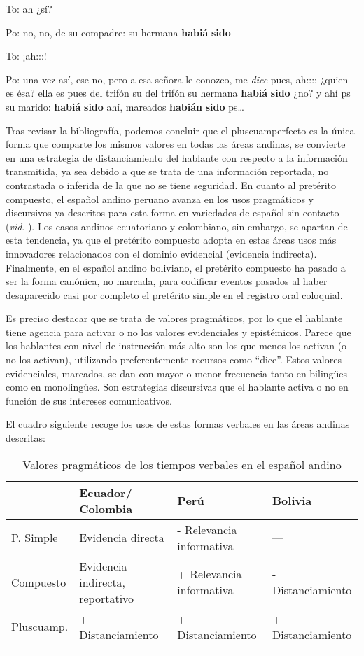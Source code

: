 \documentclass[output=paper]{../langscibook}
\begin{document}
To:  ah ¿sí?

Po:  no, no, de su compadre: su hermana \textbf{habiá} \textbf{sido}

To:  ¡ah:::!

Po:  una vez así, ese no, pero a esa señora le conozco, me \textit{dice} pues, ah:::: ¿quien es ésa? ella es pues del trifón su del trifón su hermana \textbf{habiá} \textbf{sido} ¿no? y ahí ps su marido: \textbf{habiá} \textbf{sido} ahí, mareados \textbf{habián} \textbf{sido} ps…
\z

Tras revisar la bibliografía, podemos concluir que el pluscuamperfecto es la única forma que comparte los mismos valores en todas las áreas andinas, se convierte en una estrategia de distanciamiento del hablante con respecto a la información transmitida, ya sea debido a que se trata de una información reportada, no contrastada o inferida de la que no se tiene seguridad. En cuanto al pretérito compuesto, el español andino peruano avanza en los usos pragmáticos y discursivos ya descritos para esta forma en variedades de español sin contacto (\textit{vid}. ). Los casos andinos ecuatoriano y colombiano, sin embargo, se apartan de esta tendencia, ya que el pretérito compuesto adopta en estas áreas usos más innovadores relacionados con el dominio evidencial (evidencia indirecta). Finalmente, en el español andino boliviano, el pretérito compuesto ha pasado a ser la forma canónica, no marcada, para codificar eventos pasados al haber desaparecido casi por completo el pretérito simple en el registro oral coloquial.

Es preciso destacar que se trata de valores pragmáticos, por lo que el hablante tiene agencia para activar o no los valores evidenciales y epistémicos. Parece que los hablantes con nivel de instrucción más alto son los que menos los activan (o no los activan), utilizando preferentemente recursos como “dice”. Estos valores evidenciales, marcados, se dan con mayor o menor frecuencia tanto en bilingües como en monolingües. Son estrategias discursivas que el hablante activa o no en función de sus intereses comunicativos.

El cuadro siguiente recoge los usos de estas formas verbales en las áreas andinas descritas:

\begin{table}
\caption{\label{tab:palacios:1}Valores pragmáticos de los tiempos verbales en el español andino}

\begin{tabularx}{\textwidth}{lQQQ}
\lsptoprule
& Ecuador/ Colombia & Perú & Bolivia\\
\midrule
P. Simple & Evidencia directa & {}- Relevancia informativa & ---\\
Compuesto & Evidencia indirecta, reportativo & + Relevancia informativa & {}- Distanciamiento\\
Pluscuamp. & + Distanciamiento & + Distanciamiento & + Distanciamiento\\
\lspbottomrule
\end{tabularx}
\end{table}
\end{document}
